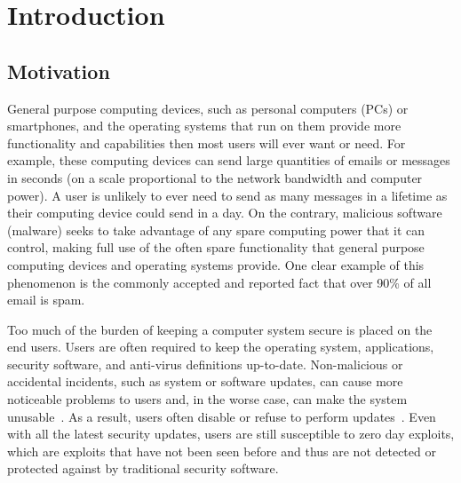 
\chapter{Introduction}

\section{Motivation}

General purpose computing devices, such as personal computers (PCs) or smartphones, and the operating systems that run on them provide more functionality and capabilities then most users will ever want or need. For example, these computing devices can send large quantities of emails or messages in seconds (on a scale proportional to the network bandwidth and computer power). A user is unlikely to ever need to send as many messages in a lifetime as their computing device could send in a day. On the contrary, malicious software (malware) seeks to take advantage of any spare computing power that it can control, making full use of the often spare functionality that general purpose computing devices and operating systems provide. One clear example of this phenomenon is the commonly accepted and reported fact that over 90\% of all email is spam\cite{spamcraft_2009}.

Too much of the burden of keeping a computer system secure is placed on the end users. Users are often required to keep the operating system, applications, security software, and anti-virus definitions up-to-date. Non-malicious or accidental incidents, such as system or software updates, can cause more noticeable problems to users and, in the worse case, can make the system unusable~\cite{MSRC_XP_blue_screen_2010, Krebs_2010, Tech_World_2005, Japan_Times_2005}. As a result, users often disable or refuse to perform updates~\cite{The_Register_2009, Microsoft_TechNet_2010, MS_SIR_2009}. Even with all the latest security updates, users are still susceptible to zero day exploits, which are exploits that have not been seen before and thus are not detected or protected against by traditional security software. 

